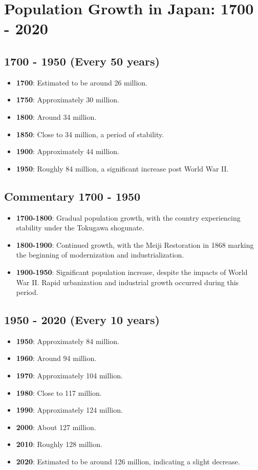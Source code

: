 \section{Population Growth in Japan: 1700 - 2020}

\subsection*{1700 - 1950 (Every 50 years)}
\begin{itemize}
    \item \textbf{1700}: Estimated to be around 26 million.
    \item \textbf{1750}: Approximately 30 million.
    \item \textbf{1800}: Around 34 million.
    \item \textbf{1850}: Close to 34 million, a period of stability.
    \item \textbf{1900}: Approximately 44 million.
    \item \textbf{1950}: Roughly 84 million, a significant increase post World War II.
\end{itemize}

\subsection*{Commentary 1700 - 1950}
\begin{itemize}
    \item \textbf{1700-1800}: Gradual population growth, with the country experiencing stability under the Tokugawa shogunate.
    \item \textbf{1800-1900}: Continued growth, with the Meiji Restoration in 1868 marking the beginning of modernization and industrialization.
    \item \textbf{1900-1950}: Significant population increase, despite the impacts of World War II. Rapid urbanization and industrial growth occurred during this period.
\end{itemize}

\subsection*{1950 - 2020 (Every 10 years)}
\begin{itemize}
    \item \textbf{1950}: Approximately 84 million.
    \item \textbf{1960}: Around 94 million.
    \item \textbf{1970}: Approximately 104 million.
    \item \textbf{1980}: Close to 117 million.
    \item \textbf{1990}: Approximately 124 million.
    \item \textbf{2000}: About 127 million.
    \item \textbf{2010}: Roughly 128 million.
    \item \textbf{2020}: Estimated to be around 126 million, indicating a slight decrease.
\end{itemize}

